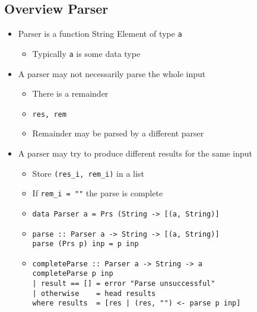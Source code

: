 \subsection{Overview Parser}
\begin{itemize}
    \item Parser is a function
     String
     Element of type \verb+a+
        \begin{itemize}
            \item Typically \verb+a+ is some data type
        \end{itemize}
    \item A parser may not necessarily parse the whole input
        \begin{itemize}
            \item There is a remainder
            \item \verb+res, rem+
            \item Remainder may be parsed by a different parser
        \end{itemize}
    \item A parser may try to produce different results for the same input
        \begin{itemize}
            \item Store \verb+(res_i, rem_i)+ in a list
            \item If \verb+rem_i = ""+ the parse is complete
            \item \verb+data Parser a = Prs (String -> [(a, String)]+
        \end{itemize}
        \begin{itemize}
            \item
\begin{verbatim}
parse :: Parser a -> String -> [(a, String)]
parse (Prs p) inp = p inp
\end{verbatim}
        \end{itemize}
        \begin{itemize}
            \item
\begin{verbatim}
completeParse :: Parser a -> String -> a
completeParse p inp
| result == [] = error "Parse unsuccessful"
| otherwise    = head results
where results  = [res | (res, "") <- parse p inp]
\end{verbatim}
        \end{itemize}

\end{itemize}
